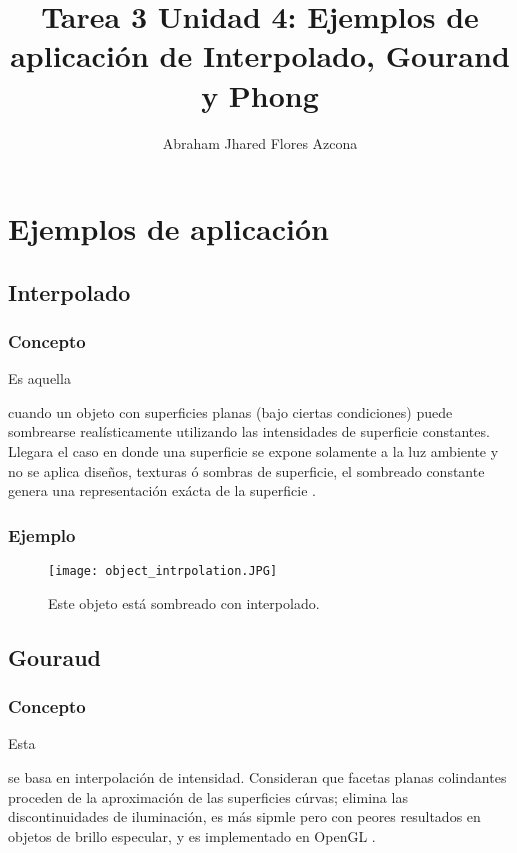 \documentclass[stu, 12pt, letterpaper, donotrepeattitle, floatsintext, natbib]{apa7}
\title{\Large Tarea 3 Unidad 4: Ejemplos de aplicación de Interpolado, Gourand y Phong}
\author{Abraham Jhared Flores Azcona} %
\affiliation{Instituto Tecnológico de Tijuana}
\begin{document}
    \maketitle

    \newpage
    \section{Ejemplos de aplicación}
    \vspace{\baselineskip}
    \subsection{Interpolado}
    \subsubsection{Concepto}
    Es aquella \begin{justifying}
      cuando un objeto con superficies planas (bajo ciertas condiciones)
      puede sombrearse realísticamente utilizando las intensidades de superficie constantes.
      Llegara el caso en donde una superficie se expone solamente a la luz ambiente y no se aplica
      diseños, texturas ó sombras de superficie, el sombreado constante genera una representación exácta
      de la superficie \citep{unknown-author-2021}.\par
    \end{justifying}
    \vspace{\baselineskip}
    \subsubsection{Ejemplo}
    \begin{figure}[H]
      \centering
      \texttt{[image: object\_intrpolation.JPG]}
      \caption{Este objeto está sombreado con interpolado.}
    \end{figure}
    \vspace{\baselineskip}
    \subsection{Gouraud}
    \subsubsection{Concepto}
    Esta \begin{justifying}
      se basa en interpolación de intensidad. Consideran que facetas planas colindantes proceden
      de la aproximación de las superficies cúrvas; elimina las discontinuidades de iluminación, es más sipmle
      pero con peores resultados en objetos de brillo especular, y es implementado en OpenGL \citep{garcia-2021}.\par
    \end{justifying}
    \vspace{\baselineskip}
\end{document}
